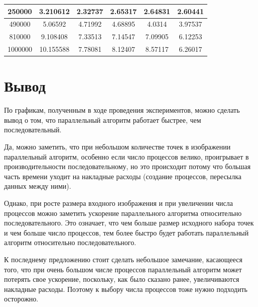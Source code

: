 \documentclass[a4paper, 12pt]{extarticle}
\newcommand{\n}{\par}
\begin{document}
\begin{longtable}[c]{|c|ccccc|}
		250000                                                                                   & \multicolumn{1}{c|}{3.210612}                                                                                      & \multicolumn{1}{c|}{2.32737}             & \multicolumn{1}{c|}{2.65317}             & \multicolumn{1}{c|}{2.64831}              & 2.60441               \\ \hline
		490000                                                                                   & \multicolumn{1}{c|}{5.06592}                                                                                       & \multicolumn{1}{c|}{4.71992}             & \multicolumn{1}{c|}{4.68895}             & \multicolumn{1}{c|}{4.0314}               & 3.97537               \\ \hline
		810000                                                                                   & \multicolumn{1}{c|}{9.108408}                                                                                      & \multicolumn{1}{c|}{7.33513}             & \multicolumn{1}{c|}{7.14547}             & \multicolumn{1}{c|}{7.09905}              & 6.12253               \\ \hline
		1000000                                                                                  & \multicolumn{1}{c|}{10.155588}                                                                                     & \multicolumn{1}{c|}{7.78081}             & \multicolumn{1}{c|}{8.12407}             & \multicolumn{1}{c|}{8.57117}              & 6.26017               \\ \hline
	\end{longtable}
	\newpage
	\section{Вывод}
	По графикам, полученным в ходе проведения экспериментов, можно сделать вывод о том, что параллельный алгоритм работает быстрее, чем последовательный.\n
	Да, можно заметить, что при небольшом количестве точек в изображении параллельный алгоритм, особенно если число процессов велико, проигрывает в производительности последовательному, но это происходит потому что большая часть времени уходит на накладные расходы (создание процессов, пересылка данных между ними).\n
	Однако, при росте размера входного изображения и при увеличении числа процессов можно заметить ускорение параллельного алгоритма относительно последовательного. Это означает, что чем больше размер исходного набора точек и чем больше число процессов, тем более быстро будет работать параллельный алгоритм относительно последовательного.\n
	К последнему предложению стоит сделать небольшое замечание, касающееся того, что при очень большом числе процессов параллельный алгоритм может потерять свое ускорение, поскольку, как было сказано ранее, увеличиваются накладные расходы. Поэтому к выбору числа процессов тоже нужно подходить осторожно.
	\newpage
\end{document}
